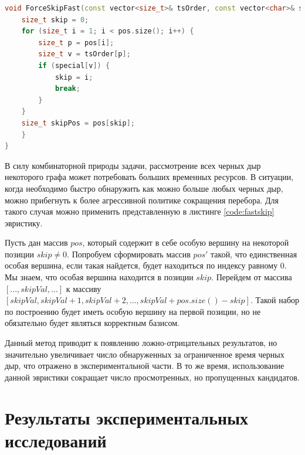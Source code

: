 \documentclass[12pt,a4paper,oneside,openany]{article}
\theoremstyle{definition}
\theoremstyle{lemma}
\theoremstyle{remark}
\begin{document}
\begin{lstlisting}[language=C++, caption=Пропуск большого числа кандидатов. Допускаются ложно-отрицательные результаты., label=code:fastskip]
void ForceSkipFast(const vector<size_t>& tsOrder, const vector<char>& special, std::vector<size_t>& pos) {
    size_t skip = 0;
    for (size_t i = 1; i < pos.size(); i++) {
        size_t p = pos[i];
        size_t v = tsOrder[p];
        if (special[v]) {
            skip = i;
            break;
        }
    }
    size_t skipPos = pos[skip];
    }
}
\end{lstlisting}


В силу комбинаторной природы задачи, рассмотрение всех черных дыр некоторого графа может
потребовать больших временных ресурсов. В ситуации, когда необходимо быстро обнаружить
как можно больше любых черных дыр, можно прибегнуть к более агрессивной политике сокращения
перебора. Для такого случая можно применить представленную в листинге \ref{code:fastskip}
эвристику.

Пусть дан массив $pos$, который содержит в себе особую вершину на некоторой позиции $skip \neq 0$.
Попробуем сформировать массив $pos'$ такой, что единственная особая вершина, если такая найдется,
будет находиться по индексу равному $0$.
Мы знаем, что особая вершина  находится в позиции $skip$. Перейдем от массива $[..., skipVal, ...]$ к массиву
$[skipVal, skipVal + 1, skipVal + 2, ... , skipVal + pos.size() - skip]$.
Такой набор по построению будет иметь особую вершину на первой позиции, но не обязательно будет являться корректным базисом.

Данный метод приводит к появлению ложно-отрицательных результатов, но значительно увеличивает число обнаруженных за
ограниченное время черных дыр, что отражено в экспериментальной части. В то же время, использование данной эвристики
сокращает число просмотренных, но пропущенных кандидатов.

\cleardoublepage
\section{Результаты экспериментальных исследований}\label{sec:experimentalresults}
\end{document}
